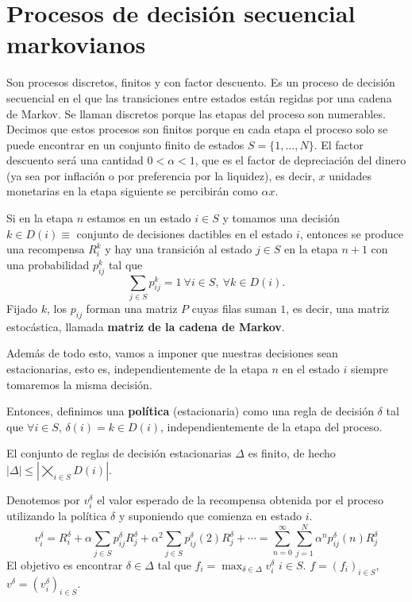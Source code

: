 \documentclass[MIOP.tex]{subfiles}
\begin{document}
\section{Procesos de decisión secuencial markovianos}
Son procesos discretos, finitos y con factor descuento. Es un proceso de decisión secuencial en el que las transiciones entre estados están regidas por una cadena de Markov. Se llaman discretos porque las etapas del proceso son numerables. Decimos que estos procesos son finitos porque en cada etapa el proceso solo se puede encontrar en un conjunto finito de estados $S=\{1,\dots, N\}$. El factor descuento será una cantidad $0<\alpha <1$, que es el factor de depreciación del dinero (ya sea por inflación o por preferencia por la liquidez), es decir, $x$ unidades monetarias en la etapa siguiente se percibirán como $\alpha x$. 

Si en la etapa $n$ estamos en un estado $i\in S$ y tomamos una decisión $k\in D(i)\equiv$ conjunto de decisiones dactibles en el estado $i$, entonces se produce una recompensa $R^k_i$ y hay una transición al estado $j\in S$ en la etapa $n+1$ con una probabilidad $p_{ij}^k$ tal que 
$$\sum_{j\in S}p_{ij}^k=1\ \forall i\in S,\ \forall k\in D(i).$$
Fijado $k$, los $p_{ij}$ forman una matriz $P$ cuyas filas suman $1$, es decir, una matriz estocástica, llamada \textbf{matriz de la cadena de Markov}.

Además de todo esto, vamos a imponer que nuestras decisiones sean estacionarias, esto es, independientemente de la etapa $n$ en el estado $i$ siempre tomaremos la misma decisión. 

Entonces, definimos una \textbf{política} (estacionaria) como una regla de decisión $\delta$ tal que $\forall i\in S$, $\delta(i)=k\in D(i)$, independientemente de la etapa del proceso.

El conjunto de reglas de decisión estacionarias $\Delta$ es finito, de hecho $|\Delta|\leq |\bigtimes_{i\in S} D(i)|$.  

Denotemos por $v^\delta_i$ el valor esperado de la recompensa obtenida por el proceso utilizando la política $\delta$ y suponiendo que comienza en estado $i$. 
$$v^\delta_i=R^\delta_i+\alpha\sum_{j\in S} p_{ij}^\delta R_j^\delta +\alpha^2\sum_{j\in S}p_{ij}^\delta(2)R_j^\delta+\cdots=\sum_{n=0}^\infty\sum_{j=1}^N\alpha^n p_{ij}^\delta(n) R_j^\delta$$
El objetivo es encontrar $\delta\in\Delta$ tal que $f_i=\max_{\delta\in\Delta}v_i^\delta$ $i\in S$. $f=(f_i)_{i\in S}$, $v^\delta=(v_i^\delta)_{i\in S}$.
\end{document}
